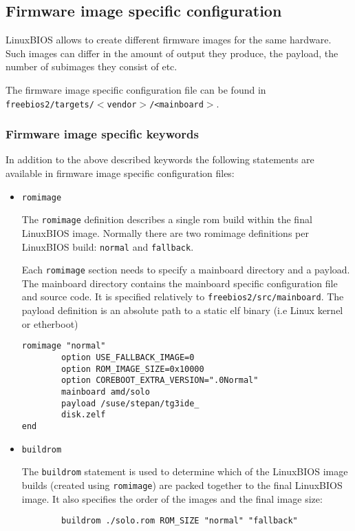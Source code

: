\documentclass[titlepage,12pt]{article}
\begin{document}
\subsection{Firmware image specific configuration}
LinuxBIOS allows to create different firmware images for the same
hardware. Such images can differ in the amount of output they produce,
the payload, the number of subimages they consist of etc.

The firmware image specific configuration file can be found in \\
\texttt{freebios2/targets/$<$vendor$>$/<mainboard$>$}.

\subsubsection{Firmware image specific keywords}
In addition to the above described keywords the following statements are
available in firmware image specific configuration files:

\begin{itemize}
\item \begin{verbatim}romimage\end{verbatim}

The \texttt{romimage} definition describes a single rom build within the
final LinuxBIOS image. Normally there are two romimage definitions per
LinuxBIOS build: \texttt{normal} and \texttt{fallback}.

Each \texttt{romimage} section needs to specify a mainboard directory and a
payload. The mainboard directory contains the mainboard specific
configuration file and source code. It is specified relatively to
\texttt{freebios2/src/mainboard}. The payload definition is an absolute
path to a static elf binary (i.e Linux kernel or etherboot)

\begin{verbatim}
romimage "normal"
        option USE_FALLBACK_IMAGE=0
        option ROM_IMAGE_SIZE=0x10000
        option COREBOOT_EXTRA_VERSION=".0Normal"
        mainboard amd/solo
        payload /suse/stepan/tg3ide_
        disk.zelf
end
\end{verbatim}

\item \begin{verbatim}buildrom\end{verbatim}

The \texttt{buildrom} statement is used to determine which of the
LinuxBIOS image builds (created using \texttt{romimage}) are packed
together to the final LinuxBIOS image. It also specifies the order of
the images and the final image size:

\begin{verbatim}
        buildrom ./solo.rom ROM_SIZE "normal" "fallback"
\end{verbatim}

\end{itemize}
\end{document}
